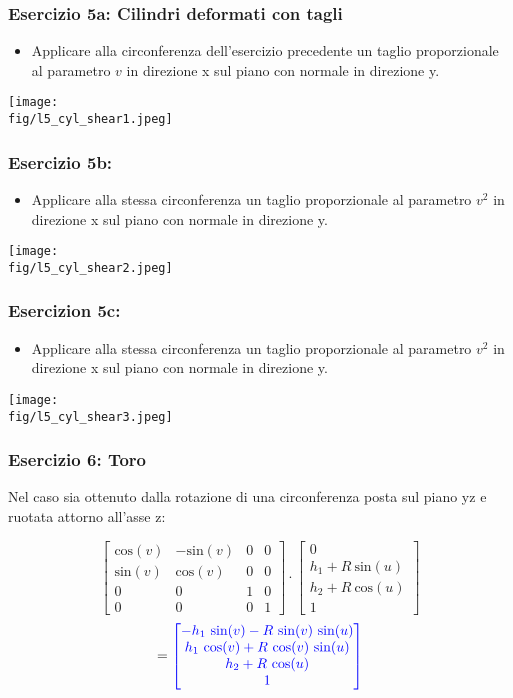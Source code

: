 \documentclass{beamer}
\newcommand{\fig}{./figures} %
\newcommand{\msin}{\mbox{sin}} %
\newcommand{\mcos}{\mbox{cos}} %
\begin{document}
\begin{frame}
\frametitle{Esercizio 5a: Cilindri deformati con tagli}
\begin{itemize}
\item Applicare alla circonferenza dell'esercizio precedente un taglio
proporzionale al parametro $v$ in direzione x sul piano con normale in
direzione y.
\end{itemize}
\begin{center}
\texttt{[image: \\fig/l5\_cyl\_shear1.jpeg]}
\end{center}
\end{frame}
\begin{frame}
\frametitle{Esercizio 5b:}
\begin{itemize}
\item Applicare alla stessa circonferenza un taglio
proporzionale al parametro $v^2$ in direzione x sul piano con normale in
direzione y.
\end{itemize}
\begin{center}
\texttt{[image: \\fig/l5\_cyl\_shear2.jpeg]}
\end{center}
\end{frame}
\begin{frame}
\frametitle{Esercizion 5c:}
\begin{itemize}
\item Applicare alla stessa circonferenza un taglio
proporzionale al parametro $v^2$ in direzione x sul piano con normale in
direzione y.
\end{itemize}
\begin{center}
\texttt{[image: \\fig/l5\_cyl\_shear3.jpeg]}
\end{center}
\end{frame}
\begin{frame}
\frametitle{Esercizio 6: Toro}
Nel caso sia ottenuto dalla rotazione di una circonferenza posta sul piano yz e ruotata attorno all'asse z:
\begin{center}
\begin{displaymath}
\begin{bmatrix}
\mcos(v) & -\msin(v) & 0 & 0  \\
\msin(v) &  \mcos(v) & 0 & 0  \\
0        &  0        & 1 & 0  \\
0        &  0        & 0 & 1
\end{bmatrix}
\cdot
\begin{bmatrix}
0 \\
h_1+R~\msin(u)\\
h_2+R~\mcos(u)\\
1
\end{bmatrix}
\end{displaymath}
\begin{displaymath}
={\color{blue} 
\begin{bmatrix}
-h_1~\msin(v)- R ~\msin(v)~\msin(u)\\
h_1~\mcos(v) + R~\mcos(v)~\msin(u)\\
h_2+R~\mcos(u)\\
1
\end{bmatrix}}
\end{displaymath}
\end{center}
\end{frame}
\end{document}
